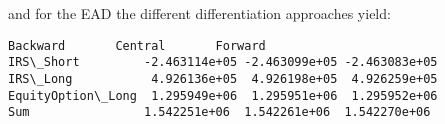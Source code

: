     and for the EAD the different differentiation approaches yield:

            \begin{tcolorbox}[breakable, size=fbox, boxrule=.5pt, pad at break*=1mm, opacityfill=0]
\begin{Verbatim}[commandchars=\\\{\}]
                       Backward       Central       Forward
IRS\_Short         -2.463114e+05 -2.463099e+05 -2.463083e+05
IRS\_Long           4.926136e+05  4.926198e+05  4.926259e+05
EquityOption\_Long  1.295949e+06  1.295951e+06  1.295952e+06
Sum                1.542251e+06  1.542261e+06  1.542270e+06
\end{Verbatim}
\end{tcolorbox}
        

